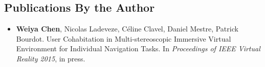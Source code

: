 \begin{appendices}
\chapter{Publications By the Author}

\begin{itemize}
\item \textbf{Weiya Chen}, Nicolas Ladeveze, C\'eline Clavel, Daniel Mestre, Patrick Bourdot. User Cohabitation in Multi-stereoscopic Immersive Virtual Environment for Individual Navigation Tasks. In \emph{Proceedings of IEEE Virtual Reality 2015}, in press.
\end{itemize}

\end{appendices}